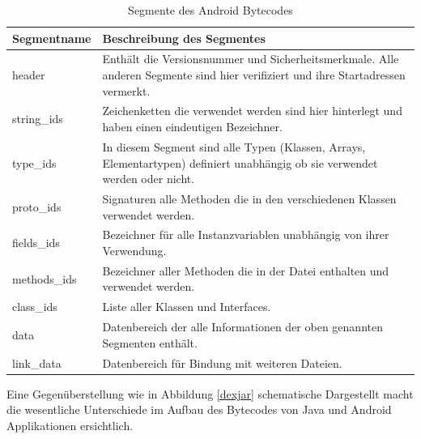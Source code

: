 \begin{table}[p]
\begin{tabular}{|p{3cm}|p{11cm}|}\hline

   \textbf{Segmentname} & \textbf{Beschreibung des Segmentes} \\ \hline

   header & Enthält die Versionsnummer und Sicherheitsmerkmale. Alle anderen Segmente sind hier verifiziert und ihre Startadressen vermerkt. \\ \hline

   string\_ids & Zeichenketten die verwendet werden sind hier hinterlegt und haben einen eindeutigen Bezeichner. \\ \hline

   type\_ids & In diesem Segment sind alle Typen (Klassen, Arrays, Elementartypen) definiert unabhängig ob sie verwendet werden oder nicht. \\ \hline

   proto\_ids & Signaturen alle Methoden die in den verschiedenen Klassen verwendet werden. \\ \hline

   fields\_ids & Bezeichner für alle Instanzvariablen unabhängig von ihrer Verwendung. \\ \hline

   methods\_ids & Bezeichner aller Methoden die in der Datei enthalten und verwendet werden. \\ \hline

   class\_ids & Liste aller Klassen und Interfaces.\\ \hline

   data & Datenbereich der alle Informationen der oben genannten Segmenten enthält.\\ \hline
   
   link\_data & Datenbereich für Bindung mit weiteren Dateien. \\ \hline
  
\end{tabular}
\caption{Segmente des Android Bytecodes}
\label{segand}
\end{table} 
 
 Eine Gegenüberstellung wie in Abbildung \ref{dexjar} schematische Dargestellt macht die wesentliche Unterschiede im Aufbau des Bytecodes von Java und Android Applikationen ersichtlich.
 
